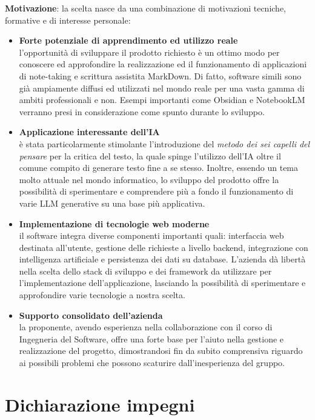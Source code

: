 \documentclass[a4paper,10pt]{article}
\begin{document}
\textbf{Motivazione}: la scelta nasce da una combinazione di motivazioni tecniche, formative e di interesse personale:
\begin{itemize}
    \item \textbf{Forte potenziale di apprendimento ed utilizzo reale}\\
    l'opportunità di sviluppare il prodotto richiesto è un ottimo modo per conoscere ed approfondire la realizzazione ed il funzionamento di applicazioni di note-taking e scrittura assistita MarkDown. Di fatto, software simili sono già ampiamente diffusi ed utilizzati nel mondo reale per una vasta gamma di ambiti professionali e non. Esempi importanti come Obsidian e NotebookLM verranno presi in considerazione come spunto durante lo sviluppo.
    \item \textbf{Applicazione interessante dell'IA}\\
    è stata particolarmente stimolante l'introduzione del \textit{metodo dei sei capelli del pensare} per la critica del testo, la quale spinge l'utilizzo dell'IA oltre il comune compito di generare testo fine a se stesso. Inoltre, essendo un tema molto attuale nel mondo informatico, lo sviluppo del prodotto offre la possibilità di sperimentare e comprendere più a fondo il funzionamento di varie LLM generative su una base più applicativa.
    \item \textbf{Implementazione di tecnologie web moderne}\\
    il software integra diverse componenti importanti quali: interfaccia web destinata all'utente, gestione delle richieste a livello backend, integrazione con intelligenza artificiale e persistenza dei dati su database. L'azienda dà libertà nella scelta dello stack di sviluppo e dei framework da utilizzare per l'implementazione dell'applicazione, lasciando la possibilità di sperimentare e approfondire varie tecnologie a nostra scelta.
    \item \textbf{Supporto consolidato dell'azienda}\\
    la proponente, avendo esperienza nella collaborazione con il corso di Ingegneria del Software, offre una forte base per l'aiuto nella gestione e realizzazione del progetto, dimostrandosi fin da subito comprensiva riguardo ai possibili problemi che possono scaturire dall'inesperienza del gruppo.
\end{itemize}

\newpage

\section*{Dichiarazione impegni}
\end{document}
